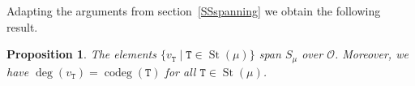 \documentclass[twoside,11pt,reqno]{amsart}
\numberwithin{equation}{section}
\newtheorem{Proposition}[equation]{Proposition}
\newtheorem{Lemma}[equation]{Lemma}
\theoremstyle{definition}  %
\DeclareMathOperator\ldom {\triangleleft}
\DeclareMathOperator\gdom {\triangleright}
\def\bi{\text{\boldmath$i$}}
\newcommand{\St}{\operatorname{St}}
\newcommand{\0}{{\bar 0}}
\newcommand{\1}{{\bar 1}}
\newcommand{\al}{\alpha}
\def\Si{\mathfrak{S}}
\newcommand{\D}{{\mathscr D}}
\newcommand\Par[1][]{{\mathscr P}^{\kappa#1}}
\def\T{{\mathtt T}}
\def\U{{\mathtt U}}
\def\G{{\mathtt G}}
\def\codeg{\operatorname{codeg}}
\def\Gar{{\operatorname{Gar}}}
\renewcommand\O{\mathcal O}
\begin{document}
Adapting the arguments from section~\ref{SSspanning} we obtain the 
following result.


\begin{Proposition} \label{signed PSpan}%
The elements 
$\{v_\T\mid \T\in\St(\mu)\}$
span $S_\mu$ over $\O$. Moreover, we have $\deg(v_\T)=\codeg(\T)$ for all $\T\in \St(\mu)$. 
\end{Proposition}

%
\end{document}
